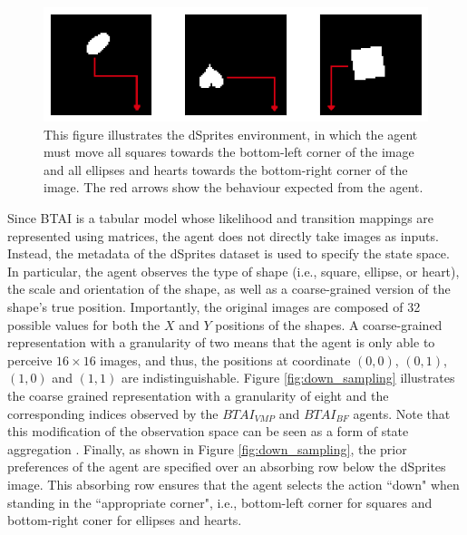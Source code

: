 \documentclass[twoside,11pt]{article}
\begin{document}
\begin{figure}[H]
	\begin{center}
	\includegraphics[scale=2]{dSprites_env}
	\end{center}
  \caption{This figure illustrates the dSprites environment, in which the agent must move all squares towards the bottom-left corner of the image and all ellipses and hearts towards the bottom-right corner of the image. The red arrows show the behaviour expected from the agent.}
   \label{fig:dSprites_env}
\end{figure}

Since BTAI is a tabular model whose likelihood and transition mappings are represented using matrices, the agent does not directly take images as inputs. Instead, the metadata of the dSprites dataset is used to specify the state space. In particular, the agent observes the type of shape (i.e., square, ellipse, or heart), the scale and orientation of the shape, as well as a coarse-grained version of the shape's true position. Importantly, the original images are composed of 32 possible values for both the $X$ and $Y$ positions of the shapes. A coarse-grained  representation with a granularity of two means that the agent is only able to perceive $16 \times 16$ images, and thus, the positions at coordinate $(0,0)$, $(0,1)$, $(1,0)$ and $(1,1)$ are indistinguishable. Figure \ref{fig:down_sampling} illustrates the coarse grained representation with a granularity of eight and the corresponding indices observed by the $BTAI_{VMP}$ and $BTAI_{BF}$ agents. Note that this modification of the observation space can be seen as a form of state aggregation \citep{STATES_AGGREG}. Finally, as shown in Figure \ref{fig:down_sampling}, the prior preferences of the agent are specified over an absorbing row below the dSprites image. This absorbing row ensures that the agent selects the action ``down" when standing in the ``appropriate corner", i.e., bottom-left corner for squares and bottom-right coner for ellipses and hearts.
\end{document}
